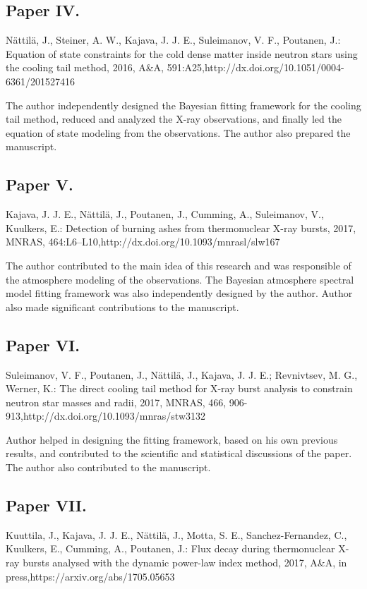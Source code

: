 \subsection{Paper IV.}
Nättilä, J., Steiner, A. W., Kajava, J. J. E., Suleimanov, V. F., Poutanen, J.: Equation of state constraints for the cold dense matter inside neutron stars using the cooling tail method, 2016, A&A, 591:A25,http://dx.doi.org/10.1051/0004-6361/201527416

The author independently designed the Bayesian fitting framework for the cooling tail method, reduced and analyzed the X-ray observations, and finally led the equation of state modeling from the observations. 
The author also prepared the manuscript.


\subsection{Paper V.}
Kajava, J. J. E., Nättilä, J., Poutanen, J., Cumming, A., Suleimanov, V., Kuulkers, E.: Detection of burning ashes from thermonuclear X-ray bursts, 2017, MNRAS, 464:L6–L10,http://dx.doi.org/10.1093/mnrasl/slw167

The author contributed to the main idea of this research and was responsible of the atmosphere modeling of the observations. The Bayesian atmosphere spectral model fitting framework was also independently designed by the author. 
Author also made significant contributions to the manuscript.


\subsection{Paper VI.}
Suleimanov, V. F., Poutanen, J., Nättilä, J., Kajava, J. J. E.; Revnivtsev, M. G., Werner, K.: The direct cooling tail method for X-ray burst analysis to constrain neutron star masses and radii, 2017, MNRAS, 466, 906-913,http://dx.doi.org/10.1093/mnras/stw3132

Author helped in designing the fitting framework, based on his own previous results, and contributed to the scientific and statistical discussions of the paper. 
The author also contributed to the manuscript.


\subsection{Paper VII.}
Kuuttila, J., Kajava, J. J. E., Nättilä, J., Motta, S. E., Sanchez-Fernandez, C., Kuulkers, E., Cumming, A., Poutanen, J.: Flux decay during thermonuclear X-ray bursts analysed with the dynamic power-law index method, 2017, A&A, in press,https://arxiv.org/abs/1705.05653

